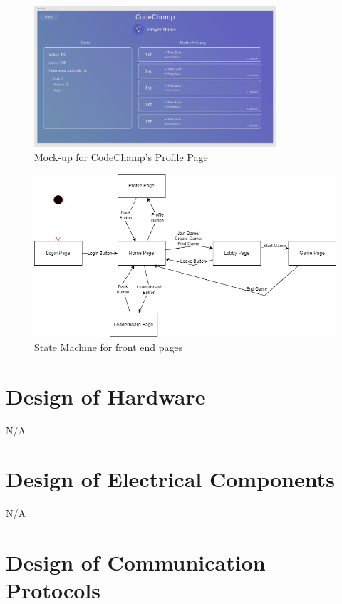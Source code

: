 \documentclass[12pt, titlepage]{article}
\begin{document}
\begin{figure}[H]
\centering
\includegraphics[width=0.8\textwidth]{Design/SystDesign/ProfilePage.png}
\caption{Mock-up for CodeChamp's Profile Page}
\end{figure}

\begin{figure}[H]
\centering
\includegraphics[width=1\textwidth]{Design/SystDesign/State.png}
\caption{State Machine for front end pages}
\end{figure}

\section{Design of Hardware}

N/A

\section{Design of Electrical Components}

N/A

\section{Design of Communication Protocols}
\end{document}
